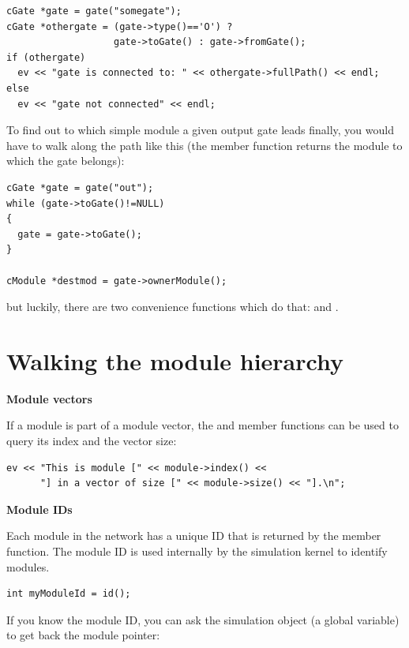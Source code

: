 \begin{verbatim}
cGate *gate = gate("somegate");
cGate *othergate = (gate->type()=='O') ?
                   gate->toGate() : gate->fromGate();
if (othergate)
  ev << "gate is connected to: " << othergate->fullPath() << endl;
else
  ev << "gate not connected" << endl;
\end{verbatim}

To find out to which simple module a given output
gate leads finally, you would have to walk
along the path like this (the  member function
returns the module to which the gate belongs):

\begin{verbatim}
cGate *gate = gate("out");
while (gate->toGate()!=NULL)
{
  gate = gate->toGate();
}

cModule *destmod = gate->ownerModule();
\end{verbatim}


but luckily, there are two convenience functions which do that:
 and
.





\section{Walking the module hierarchy}

\textbf{Module vectors}


If a module is part of a module vector, the
 and  member functions can be used to
query its index and the vector size:

\begin{verbatim}
ev << "This is module [" << module->index() <<
      "] in a vector of size [" << module->size() << "].\n";
\end{verbatim}


\textbf{Module IDs}


Each module in the network has a unique ID that is returned by the
 member function. The module ID is used
internally by the simulation kernel to identify modules.

\begin{verbatim}
int myModuleId = id();
\end{verbatim}

If you know the module ID, you can ask the simulation object
(a global variable) to get back the module pointer:

